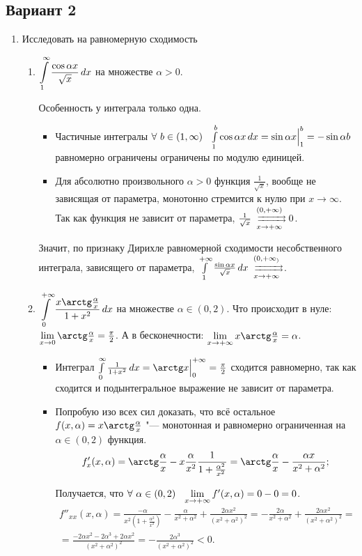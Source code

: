 \documentclass{article}
\begin{document}
\subsection*{Вариант 2}
\begin{enumerate}
\item Исследовать на равномерную сходимость
\begin{enumerate}
\item $\displaystyle\int\limits_1^{\infty}\frac{\cos\alpha x}{\sqrt x}\,dx$ на множестве $\alpha>0$.

Особенность у интеграла только одна.
\begin{itemize}
\item Частичные интегралы $\forall\ b\in(1,\infty)\pau\int\limits_1^b\cos\alpha x\,dx=\sin \alpha x\Big|_1^{b}=-\sin \alpha b$ равномерно ограничены ограничены по модулю единицей.
\item Для абсолютно произвольного $\alpha>0$ функция $\frac1{\sqrt x}$, вообще не зависящая от параметра, монотонно стремится к нулю при $x\to\infty$. Так как функция не зависит от параметра, $\frac1{\sqrt x}\rsH[(0,+\infty)]{x\to+\infty}0$.
\end{itemize}

Значит, по признаку Дирихле равномерной сходимости несобственного интеграла, зависящего от параметра, $\int\limits_1^{+\infty}\frac{\sin\alpha x}{\sqrt x}\,dx\rsH[(0,+\infty_)]{x\to+\infty}$.

\item $\ds\int\limits_0^{+\infty}\frac{x\arctg\frac{\alpha}x}{1+x^2}\,dx$ на множестве $\alpha\in(0,2)$. Что происходит в нуле: $\yo x0\arctg\frac{\alpha}x=\frac{\pi}2$. А в бесконечности: $\yo x{+\infty}x\arctg\frac{\alpha}x=\alpha$.
\begin{itemize}
\item Интеграл $\int\limits_0^{\infty}\frac{1}{1+x^2}\,dx=\arctg x\Big|_0^{+\infty}=\frac{\pi}2$ сходится равномерно, так как сходится и подынтегральное выражение не зависит от параметра.
\item Попробую изо всех сил доказать, что всё остальное $f(x,\alpha)=x\arctg\frac{\alpha}x$ "--- монотонная и равномерно ограниченная на $\alpha\in(0,2)$ функция.
\[f'_x(x,\alpha)=\arctg\frac{\alpha}x-x\frac{\alpha}{x^2}\frac1{1+\frac{\alpha^2}{x^2}}=\arctg\frac{\alpha}x-\frac{\alpha x}{x^2+\alpha^2};\]

Получается, что $\forall\ \alpha\in(0,2)\pau \yo x{+\infty}f'(x,\alpha)=0-0=0$.
\begin{multline*}f''_{xx}(x,\alpha)=\frac{-\alpha}{x^2\left(1+\frac{\alpha^2}{x^2}\right)}-\frac{\alpha}{x^2+\alpha^2}+\frac{2\alpha x^2}{(x^2+\alpha^2)^2}=-\frac{2\alpha}{x^2+\alpha^2}+\frac{2\alpha x^2}{(x^2+\alpha^2)^2}=\\=\frac{-2\alpha x^2-2\alpha^3+2\alpha x^2}{(x^2+\alpha^2)^2}=-\frac{2\alpha^3}{(x^2+\alpha^2)^2}<0.\end{multline*}


\end{itemize}
\end{enumerate}
\end{enumerate}
\end{document}
